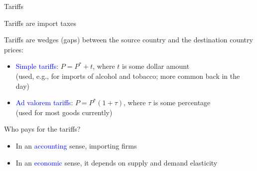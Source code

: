 \documentclass[notes,11pt, aspectratio=169, xcolor=table]{beamer}
\newcommand{\blue}[1]{\textcolor{blue}{#1}}
\newenvironment{wideitemize}{\itemize\addtolength{\itemsep}{10pt}}{\enditemize}
\begin{document}
\begin{frame}{Tariffs}
\begin{wideitemize}
    \item Tariffs are import taxes
    \item<2-> Tariffs are wedges (gaps) between the source country and the destination country prices:
    \begin{itemize}
        \item \blue{Simple tariffs}: $P = P^* + t$, where $t$ is some dollar amount \\
        \qquad (used, e.g., for imports of alcohol and tobacco; more common back in the day)
        \item \blue{Ad valorem tariffs}: $P = P^*(1+\tau)$, where $\tau$ is some percentage \\
        \qquad (used for most goods currently)
    \end{itemize}
    \item<3-> Who pays for the tariffs?
    \begin{itemize}
        \item<4-> In an \blue{accounting} sense, importing firms
        \item<5-> In an \blue{economic} sense, it depends on supply and demand elasticity
    \end{itemize}
\end{wideitemize}
    
\end{frame}
\end{document}
